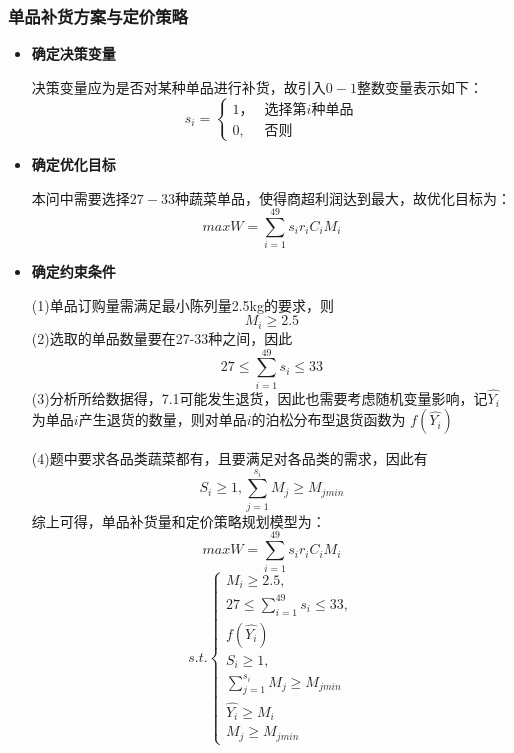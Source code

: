\documentclass{my_paper}
\begin{document}
\subsubsection{单品补货方案与定价策略}
\begin{itemize}
    \item \textbf{确定决策变量}\par
决策变量应为是否对某种单品进行补货，故引入$0-1$整数变量表示如下：
\begin{equation}
    s_i=\begin{cases}
        1，&\text{选择第}i\text{种单品}\\
        0,&\text{否则}
    \end{cases}
\end{equation}
\item \textbf{确定优化目标}\par
本问中需要选择$27-33$种蔬菜单品，使得商超利润达到最大，故优化目标为：
\begin{equation}
    maxW=\displaystyle\sum_{i=1}^{49} s_ir_iC_iM_i
\end{equation}
\item \textbf{确定约束条件}\par
(1)单品订购量需满足最小陈列量2.5kg的要求，则
\begin{equation}
    M_i \geq 2.5
\end{equation}
(2)选取的单品数量要在27-33种之间，因此
\begin{equation}
   27\leq \displaystyle\sum_{i=1}^{49} s_i \leq 33
\end{equation}
(3)分析所给数据得，7.1可能发生退货，因此也需要考虑随机变量影响，记$\hat{Y_i}$为单品$i$产生退货的数量，则对单品$i$的泊松分布型退货函数为 $f(\hat{Y_i})$

(4)题中要求各品类蔬菜都有，且要满足对各品类的需求，因此有
\begin{equation}
    S_i \geq 1,\displaystyle\sum_{j=1}^{s_i}M_j\geq M_{jmin}
\end{equation}
综上可得，单品补货量和定价策略规划模型为：
$$maxW=\displaystyle\sum_{i=1}^{49} s_ir_iC_iM_i$$
 \begin{equation}      
        s.t.\begin{cases}
             M_i \geq 2.5,\\
             27\leq \displaystyle\sum_{i=1}^{49} s_i \leq 33,\\
             f(\hat{Y_i})\\
             S_i \geq 1,\\
             \displaystyle\sum_{j=1}^{s_i}M_j\geq M_{jmin}\\
             \hat{Y_i}\geq M_i\\
             M_j\geq M_{jmin}
        \end{cases}
    \end{equation}
\end{itemize}
\end{document}
